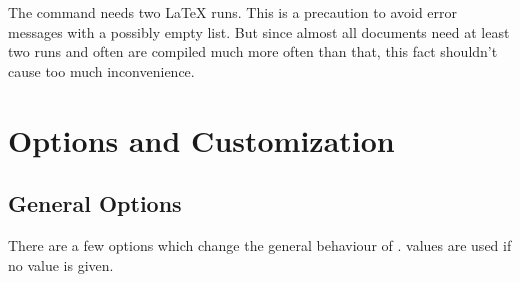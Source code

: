 \documentclass[DIV10,toc=index,toc=bib,hyperfootnotes=false]{cnpkgdoc}
\begin{document}
The command  needs two \LaTeX{} runs. This is a precaution to
avoid error messages with a possibly empty list. But since almost all documents
need at least two runs and often are compiled much more often than that, this
fact shouldn't cause too much inconvenience.

\section{Options and Customization}\label{sec:customization}
\subsection{General Options}
There are a few options which change the general behaviour of \acro.
 values are used if no value is given.
\end{document}
